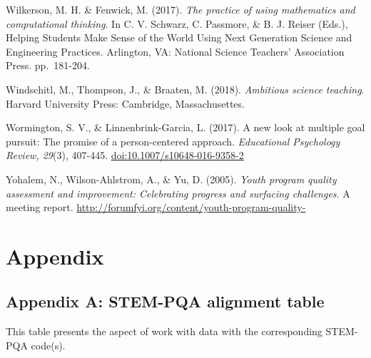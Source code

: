 \documentclass[]{book}
\theoremstyle{definition}
\theoremstyle{definition}
\theoremstyle{definition}
\theoremstyle{remark}
\begin{document}
Wilkerson, M. H. \& Fenwick, M. (2017). \emph{The practice of using
mathematics and computational thinking}. In C. V. Schwarz, C. Passmore,
\& B. J. Reiser (Eds.), Helping Students Make Sense of the World Using
Next Generation Science and Engineering Practices. Arlington, VA:
National Science Teachers' Association Press. pp.~181-204.

Windschitl, M., Thompson, J., \& Braaten, M. (2018). \emph{Ambitious
science teaching}. Harvard University Press: Cambridge, Massachusettes.

Wormington, S. V., \& Linnenbrink-Garcia, L. (2017). A new look at
multiple goal pursuit: The promise of a person-centered approach.
\emph{Educational Psychology Review, 29}(3), 407-445.
\url{doi:10.1007/s10648-016-9358-2}

Yohalem, N., Wilson-Ahlstrom, A., \& Yu, D. (2005). \emph{Youth program
quality assessment and improvement: Celebrating progress and surfacing
challenges}. A meeting report.
\url{http://forumfyi.org/content/youth-program-quality-}

\chapter{Appendix}\label{appendix}

\setlength{\parindent}{0in} \setlength{\leftskip}{0in}
\setlength{\parskip}{8pt} \noindent

\section{Appendix A: STEM-PQA alignment
table}\label{appendix-a-stem-pqa-alignment-table}

This table presents the aspect of work with data with the corresponding
STEM-PQA code(s).

\begin{landscape}\begin{table}

\caption{\label{tab:unnamed-chunk-16}Alignment of codes for instructional support for work with data and the STEM-PQA}
\centering
{}
\end{table}
\end{landscape}
\end{document}
